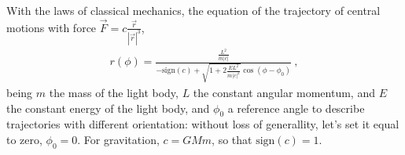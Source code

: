 \documentclass[letterpaper,10pt,english]{jupyterBook}
\begin{document}
\sphinxAtStartPar
With the laws of classical mechanics, the equation of the trajectory of central motions with force \(\vec{F} = c \frac{\vec{r}}{\left| \vec{r} \right|^3}\),
\begin{equation*}
\begin{split}r(\phi) = \frac{\frac{L^2}{m|c|}}{-\text{sign}(c) + \sqrt{1 + 2 \frac{E L^2}{m|c|^2}} \cos(\phi-\phi_0)} \ ,\end{split}
\end{equation*}
\sphinxAtStartPar
being \(m\) the mass of the light body, \(L\) the constant angular momentum, and \(E\) the constant energy of the light body, and \(\phi_0\) a reference angle to describe trajectories with different orientation: without loss of generallity, let’s set it equal to zero, \(\phi_0 = 0\). For gravitation, \(c = G M m\), so that \(\text{sign}(c) = 1\).
\end{document}
